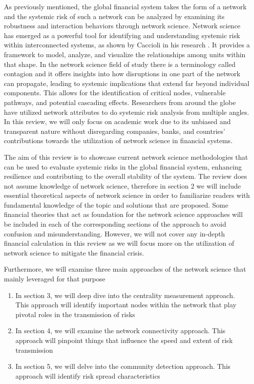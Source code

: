 \documentclass[a4paper,11pt]{article}
\begin{document}
As previously mentioned, the global financial system takes the form of a network and the systemic risk of such a network can be analyzed by examining its robustness and interaction behaviors through network science. Network science has emerged as a powerful tool for identifying and understanding systemic risk within interconnected systems, as shown by Caccioli in his research \cite{Caccioli2018}. It provides a framework to model, analyze, and visualize the relationships among units within that shape. In the network science field of study there is a terminology called contagion and it offers insights into how disruptions in one part of the network can propagate, leading to systemic implications that extend far beyond individual components. This allows for the identification of critical nodes, vulnerable pathways, and potential cascading effects. Researchers from around the globe have utilized network attributes to do systemic risk analysis from multiple angles. In this review, we will only focus on academic work due to its unbiased and transparent nature without disregarding companies, banks, and countries' contributions towards the utilization of network science in financial systems.

The aim of this review is to showcase current network science methodologies that can be used to evaluate systemic risks in the global financial system, enhancing resilience and contributing to the overall stability of the system. The review does not assume knowledge of network science, therefore in section 2 we will include essential theoretical aspects of network science in order to familiarize readers with fundamental knowledge of the topic and solutions that are proposed. Some financial theories that act as foundation for the network science approaches will be included in each of the corresponding sections of the approach to avoid confusion and misunderstanding. However, we will not cover any in-depth financial calculation in this review as we will focus more on the utilization of network science to mitigate the financial crisis.

Furthermore, we will examine three main approaches of the network science that mainly leveraged for that purpose
\begin{enumerate}
        \item In section 3, we will deep dive into the centrality measurement approach. This approach will identify important nodes within the network that play pivotal roles in the transmission of risks
        \item In section 4, we will examine the network connectivity approach. This approach will pinpoint things that influence the speed and extent of risk transmission
        \item In section 5, we will delve into the community detection approach. This approach will identify risk spread characteristics
\end{enumerate}
\end{document}
